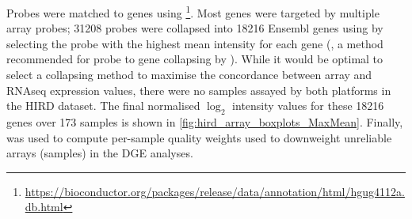 Probes were matched to genes using \footnote{\url{https://bioconductor.org/packages/release/data/annotation/html/hgug4112a.db.html}}.
Most genes were targeted by multiple array probes; \num{31208} probes were collapsed into \num{18216} Ensembl genes using by selecting the probe with the highest mean intensity for each gene (, a method recommended for probe to gene collapsing by \textcite{miller2011StrategiesAggregatingGene}).
While it would be optimal to select a collapsing method to maximise the concordance between array and \gls{RNAseq} expression values, there were no samples assayed by both platforms in the \gls{HIRD} dataset.
The final normalised $\log_2$ intensity values for these \num{18216} genes over 173 samples is shown in \cref{fig:hird_array_boxplots_MaxMean}.
Finally,  \autocite{ritchie2006EmpiricalArrayQuality} was used to compute per-sample quality weights used to downweight unreliable arrays (samples) in the \gls{DGE} analyses.

